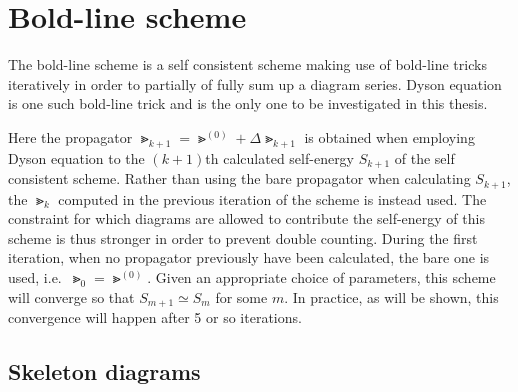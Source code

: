 \section{Bold-line scheme}

The bold-line scheme \cite{PhysRevLett.99.250201} is a self consistent scheme making use of bold-line tricks iteratively in order to partially of fully sum up a diagram series. Dyson equation is one such bold-line trick and is the only one to be investigated in this thesis.

Here the propagator  $ \Gt_{k + 1} = \Gt^{(0)} + \Delta \Gt_{k + 1} $  is obtained when employing Dyson equation to the $ (k+1) $th calculated self-energy $ S_{k+1} $ of the self consistent scheme. Rather than using the bare propagator when calculating $ S_{k+1} $, the $ \Gt_k $ computed in the previous iteration of the scheme is instead used. The constraint for which diagrams are allowed to contribute the self-energy of this scheme is thus stronger in order to prevent double counting. During the first iteration, when no propagator previously have been calculated, the bare one is used, i.e.\ $ \Gt_0 = \Gt^{(0)} $. Given an appropriate choice of parameters, this scheme will converge so that $ S_{m+1} \simeq S_{m} $ for some $ m $. In practice, as will be shown, this convergence will happen after 5 or so iterations.

\subsection{Skeleton diagrams}

